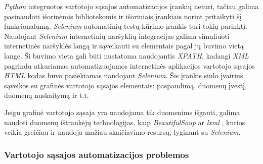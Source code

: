 \documentclass{VUMIFPSBakPrakAt}
\begin{document}
\textit{Python} integruotos vartotojo sąsajos automatizacijos įrankių neturi, tačiau galima pasinaudoti išorinėmis bibliotekomis ir išoriniais įrankiais norint pritaikyti šį funkcionalumą. \textit{Selenium} automatinių testų kūrimo įrankis turi tokią parinktį. Naudojant \textit{Selenium} internetinių naršyklių integracijas galima simuliuoti internetinės naršyklės langą ir sąveikauti su elementais pagal jų buvimo vietą lange. Ši buvimo vieta gali būti nustatoma naudojantis \textit{XPATH}, kadangi \textit{XML} pagrindu atkuriamas automatizuojamos internetinės aplikacijos vartotojo sąsajos \textit{HTML} kodas buvo pasiekiamas naudojant \textit{Selenium}. Šis įrankis siūlo įvairius sąveikos su grafinės vartotojo sąsajos elementais: paspaudimą, duomenų įvestį, duomenų nuskaitymą ir t.t.
\par
Jeigu grafinė vartotojo sąsaja yra naudojama tik duomenims išgauti, galima naudoti duomenų ištraukėjų technologijas, kaip \textit{BeautifulSoup} ar \textit{lxml} \cite{web-scrapping}, kurios veikia greičiau ir naudoja mažiau skaičiavimo resursų, lyginant su \textit{Selenium}.

\subsubsection{Vartotojo sąsajos automatizacijos problemos}\label{sec:ui-problems}
\end{document}
